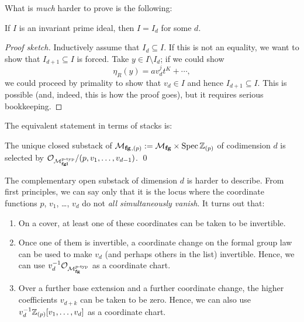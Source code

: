 \noindent What is \emph{much} harder to prove is the following:


\begin{theorem}
If $I$ is an invariant prime ideal, then $I = I_d$ for some $d$.
\end{theorem}
\begin{proof}[Proof sketch]
Inductively assume that $I_d \subseteq I$.  If this is not an equality, we want to show that $I_{d+1} \subseteq I$ is forced.  Take $y \in I \setminus I_d$; if we could show \[\eta_R(y) = a v_d^j t^K + \cdots,\] we could proceed by primality to show that $v_d \in I$ and hence $I_{d+1} \subseteq I$.  This is possible (and, indeed, this is how the proof goes), but it requires serious bookkeeping.
\end{proof}

The equivalent statement in terms of stacks is:

\begin{theorem}[Landweber]\label{LandwebersClassificationOfClosedSubstacks}
The unique closed substack of $\mathcal{M}_{\mathbf{fg}}{}_{,(p)}:= \mathcal{M}_{\mathbf{fg}} \times \operatorname{Spec} \mathbb Z_{(p)}$ of codimension $d$ is selected by $\mathcal{O}_{\mathcal{M}_{\mathbf{fgl}}^{p\text{-}\mathrm{typ}}} / (p, v_1, \ldots, v_{d-1})$. \qed
\end{theorem}

\begin{remark}
The complementary open substack of dimension $d$ is harder to describe.  From first principles, we can say only that it is the locus where the coordinate functions $p$, $v_1$, \ldots, $v_d$ do not \emph{all simultaneously vanish}.  It turns out that:
\begin{enumerate}
\item On a cover, at least one of these coordinates can be taken to be invertible.
\item Once one of them is invertible, a coordinate change on the formal group law can be used to make $v_d$ (and perhaps others in the list) invertible.  Hence, we can use $v_d^{-1} \mathcal{O}_{\mathcal{M}_{\mathbf{fg}}^{p\text{-}\mathrm{typ}}}$ as a coordinate chart.
\item Over a further base extension and a further coordinate change, the higher coefficients $v_{d+k}$ can be taken to be zero.  Hence, we can also use $v_d^{-1} \mathbb Z_{(p)}[v_1, \ldots, v_d]$ as a coordinate chart.
\end{enumerate}
\end{remark}

